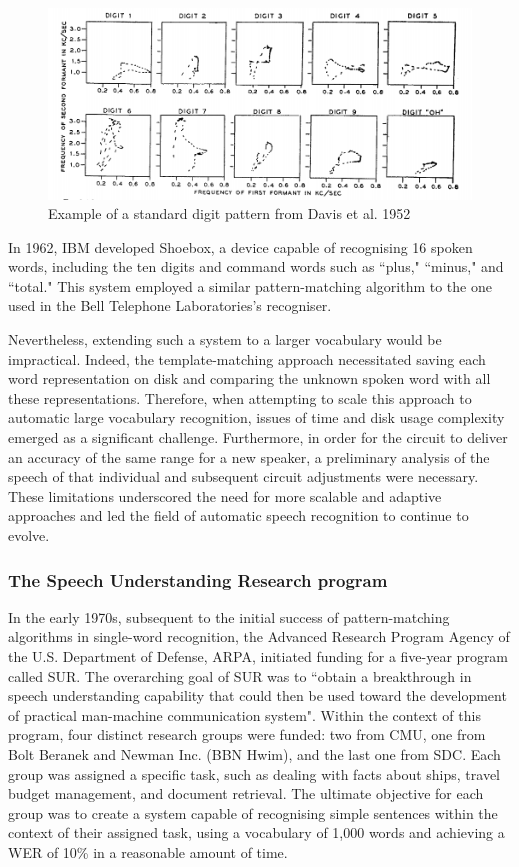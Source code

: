 \begin{figure}[h]
\includegraphics[width=\textwidth]{imgs/bell.png}
\caption{Example of a standard digit pattern from Davis et al. 1952}
\label{Bell}
\end{figure}


In 1962, IBM developed Shoebox, a device capable of recognising 16 spoken words, including the ten digits and command words such as ``plus," ``minus," and ``total." This system employed a similar pattern-matching algorithm to the one used in the Bell Telephone Laboratories's recogniser.


Nevertheless, extending such a system to a larger vocabulary would be impractical. Indeed, the template-matching approach necessitated saving each word representation on disk and comparing the unknown spoken word with all these representations. Therefore, when attempting to scale this approach to automatic large vocabulary recognition, issues of time and disk usage complexity emerged as a significant challenge. Furthermore, in order for the circuit to deliver an accuracy of the same range for a new speaker, a preliminary analysis of the speech of that individual and subsequent circuit adjustments were necessary. These limitations underscored the need for more scalable and adaptive approaches and led the field of automatic speech recognition to continue to evolve.



\subsubsection{The Speech Understanding Research program} 

In the early 1970s, subsequent to the initial success of pattern-matching algorithms in single-word recognition, the Advanced Research Program Agency of the U.S. Department of Defense, ARPA, initiated funding for a five-year program called \ac{SUR}. The overarching goal of \ac{SUR} was to ``obtain a breakthrough in speech understanding capability that could then be used toward the development of practical man-machine communication system". Within the context of this program, four distinct research groups were funded: two from \ac{CMU}, one from Bolt Beranek and Newman Inc. (BBN Hwim), and the last one from \ac{SDC}. Each group was assigned a specific task, such as dealing with facts about ships, travel budget management, and document retrieval. The ultimate objective for each group was to create a system capable of recognising simple sentences within the context of their assigned task, using a vocabulary of 1,000 words and achieving a \ac{WER} of 10\% in a reasonable amount of time.


